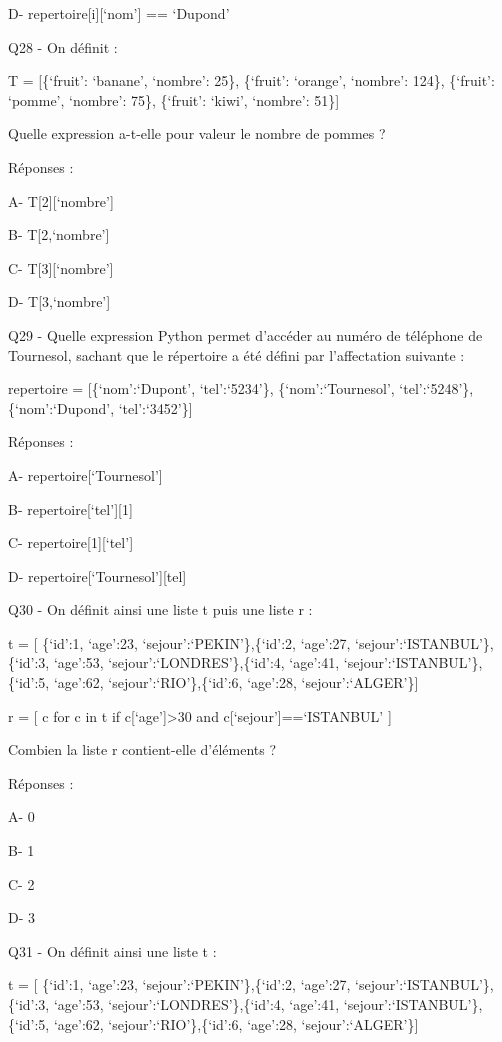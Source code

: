 \documentclass[
]{book}
\begin{document}
D- repertoire{[}i{]}{[}`nom'{]} == `Dupond'

Q28 - On définit :

T = {[}\{`fruit': `banane', `nombre': 25\}, \{`fruit': `orange', `nombre': 124\}, \{`fruit': `pomme', `nombre': 75\}, \{`fruit': `kiwi', `nombre': 51\}{]}

Quelle expression a-t-elle pour valeur le nombre de pommes ?

Réponses :

A- T{[}2{]}{[}`nombre'{]}

B- T{[}2,`nombre'{]}

C- T{[}3{]}{[}`nombre'{]}

D- T{[}3,`nombre'{]}

Q29 - Quelle expression Python permet d'accéder au numéro de téléphone de Tournesol, sachant que le répertoire a été défini par l'affectation suivante :

repertoire = {[}\{`nom':`Dupont', `tel':`5234'\}, \{`nom':`Tournesol', `tel':`5248'\}, \{`nom':`Dupond', `tel':`3452'\}{]}

Réponses :

A- repertoire{[}`Tournesol'{]}

B- repertoire{[}`tel'{]}{[}1{]}

C- repertoire{[}1{]}{[}`tel'{]}

D- repertoire{[}`Tournesol'{]}{[}tel{]}

Q30 - On définit ainsi une liste t puis une liste r :

t = {[} \{`id':1, `age':23, `sejour':`PEKIN'\},\{`id':2, `age':27, `sejour':`ISTANBUL'\},\{`id':3, `age':53, `sejour':`LONDRES'\},\{`id':4, `age':41, `sejour':`ISTANBUL'\},\{`id':5, `age':62, `sejour':`RIO'\},\{`id':6, `age':28, `sejour':`ALGER'\}{]}

r = {[} c for c in t if c{[}`age'{]}\textgreater30 and c{[}`sejour'{]}==`ISTANBUL' {]}

Combien la liste r contient-elle d'éléments ?

Réponses :

A- 0

B- 1

C- 2

D- 3

Q31 - On définit ainsi une liste t :

t = {[} \{`id':1, `age':23, `sejour':`PEKIN'\},\{`id':2, `age':27, `sejour':`ISTANBUL'\},\{`id':3, `age':53, `sejour':`LONDRES'\},\{`id':4, `age':41, `sejour':`ISTANBUL'\},\{`id':5, `age':62, `sejour':`RIO'\},\{`id':6, `age':28, `sejour':`ALGER'\}{]}
\end{document}
